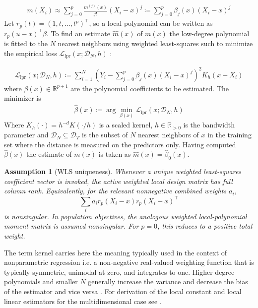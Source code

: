\documentclass[preprint,1p,times,authoryear]{elsarticle}
\newtheorem{assumption}{Assumption}
\begin{document}
\begin{align}
m(X_i) \approx \sum_{j=0}^p \frac{m^{(j)}(x)}{j!} (X_i - x)^j \coloneqq \sum_{j=0}^p \beta_j(x)(X_i - x)^j
\end{align}
Let \(r_p(t)=(1,t,\ldots,t^p)^\top\), so a local polynomial can be written as \(r_p(u-x)^\top\beta\).
To find an estimate $\hat{m}(x)$ of $m(x)$ the low-degree polynomial is fitted to the $N$ nearest neighbors using weighted least-squares such to minimize the empirical loss $\mathcal{L}_{\text{lpr}}(x; \mathcal{D}_N , h)$ :

\begin{align}
\mathcal{L}_{\text{lpr}}(x; \mathcal{D}_N , h) \coloneqq \sum_{i=1}^N \left(  Y_i - \sum_{j=0}^p \beta_j (x) (X_i-x)^j \right)^2 K_h(x-X_i)
\label{loss_lpr}
\end{align}
where $\beta(x) \in \mathbb{R}^{p+1}$ are the polynomial coefficients to be estimated. The minimizer is
\begin{align}
\hat{\beta}(x) \coloneqq \arg\min_{\beta(x)} \mathcal{L}_{\text{lpr}}(x; \mathcal{D}_N,h)
\label{beta_hat}
\end{align}
Where $K_h(\cdot) = h^{-d}K(\cdot/h)$ is a scaled kernel, $h \in \mathbb{R}_{> 0}$ is the bandwidth parameter and $\mathcal{D}_N \subseteq \mathcal{D}_T$ is the subset of $N$ nearest neighbors of $x$ in the training set where the distance is measured on the predictors only. Having computed $\hat{\beta}(x)$ the estimate of $m(x)$ is taken as $\hat{m}(x) = \hat{\beta}_0(x)$.

\begin{assumption}[WLS uniqueness]
\label{ass:wls_uniqueness}
Whenever a unique weighted least-squares coefficient vector is invoked, the active weighted local design matrix has full column rank. Equivalently, for the relevant nonnegative combined weights \(a_i\),
\[
\sum_i a_i r_p(X_i-x)r_p(X_i-x)^\top
\]
is nonsingular. In population objectives, the analogous weighted local-polynomial moment matrix is assumed nonsingular. For \(p=0\), this reduces to a positive total weight.
\end{assumption}

The term kernel carries here the meaning typically used in the context of nonparametric regression i.e. a non-negative real-valued weighting function that is typically symmetric, unimodal at zero, and integrates to one. Higher degree polynomials and smaller $N$ generally increase the variance and decrease the bias of the estimator and vice versa \citep{Fan1996Local,Garcia-Portugues2023}. For derivation of the local constant and local linear estimators for the multidimensional case see \citep{Garcia-Portugues2023}.
\end{document}
